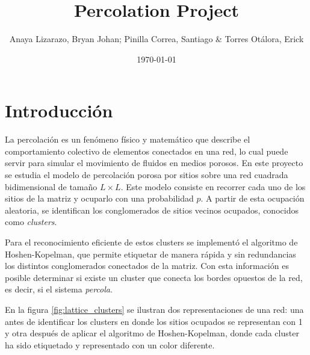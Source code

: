 \documentclass{article}
\title{Percolation Project}
\author{Anaya Lizarazo, Bryan Johan; Pinilla Correa, Santiago \& Torres Otálora, Erick}
\date{\today}
\begin{document}
 

\maketitle

\section{Introducción}

La percolación es un fenómeno físico y matemático que describe el comportamiento colectivo de elementos conectados en una red, lo cual puede servir para simular el movimiento de fluidos en medios porosos. En este proyecto se estudia el modelo de percolación porosa por sitios sobre una red cuadrada bidimensional de tamaño \( L \times L \). Este modelo consiste en recorrer cada uno de los sitios de la matriz y ocuparlo con una probabilidad \( p \). A partir de esta ocupación aleatoria, se identifican los conglomerados de sitios vecinos ocupados, conocidos como \emph{clusters}.

Para el reconocimiento eficiente de estos clusters se implementó el algoritmo de Hoshen-Kopelman, que permite etiquetar de manera rápida y sin redundancias los distintos conglomerados conectados de la matriz. Con esta información es posible determinar si existe un cluster que conecta los bordes opuestos de la red, es decir, si el sistema \emph{percola}.

En la figura \ref{fig:lattice_clusters} se ilustran dos representaciones de una red: una antes de identificar los clusters en donde los sitios ocupados se representan con 1 y otra después de aplicar el algoritmo de Hoshen-Kopelman, donde cada cluster ha sido etiquetado y representado con un color diferente.
\end{document}
